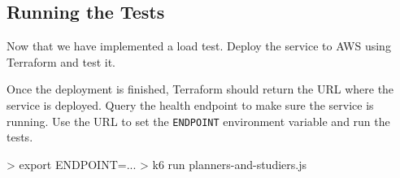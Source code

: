 \documentclass{csse4400}
\begin{document}
\subsection{Running the Tests}

Now that we have implemented a load test.
Deploy the service to AWS using Terraform and test it.


Once the deployment is finished, Terraform should return the URL where the service is deployed.
Query the health endpoint to make sure the service is running.
Use the URL to set the \texttt{ENDPOINT} environment variable and run the tests.
%
\begin{code}[language=bash,numbers=none]{}
> export ENDPOINT=...
> k6 run planners-and-studiers.js
\end{code}
\end{document}
